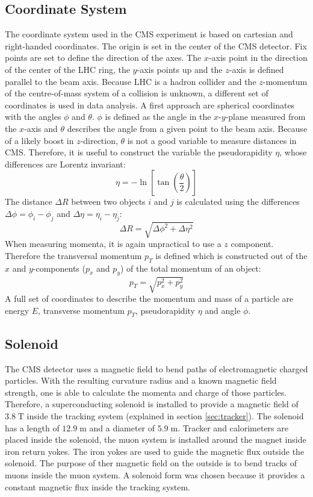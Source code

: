 \subsection{Coordinate System}
\label{sec:coordinate}
	The coordinate system used in the CMS experiment is based on cartesian and right-handed coordinates. The origin is set in the center of the CMS detector. Fix points are set to define the direction of the axes. The $x$-axis point in the direction of the center of the LHC ring, the $y$-axis points up and the $z$-axis is defined parallel to the beam axis. Because LHC is a hadron collider and the $z$-momentum of the centre-of-mass system of a collision is unknown, a different set of coordinates is used in data analysis. A first approach are spherical coordinates with the angles $\phi$ and $\theta$. $\phi$ is defined as the angle in the $x$-$y$-plane measured from the $x$-axis and $\theta$ describes the angle from a given point to the beam axis. Because of a likely boost in $z$-direction, $\theta$ is not a good variable to measure distances in CMS. Therefore, it is useful to construct the variable the pseudorapidity $\eta$, whose differences are Lorentz invariant:
	\begin{equation}
	\eta = - \ln \left[\tan\left( \frac{\theta}{2}\right) \right]
	\end{equation} 
	The distance $\Delta R$ between two objects $i$ and $j$ is calculated using the differences $\Delta \phi = \phi_i - \phi_j$ and $\Delta \eta = \eta_i - \eta_j$:
	\begin{equation}
	\Delta R = \sqrt{\Delta \phi ^2 + \Delta \eta ^2}
	\end{equation}
	When measuring momenta, it is again unpractical to use a $z$ component. Therefore the transversal momentum $p_T$ is defined which is constructed out of the $x$ and $y$-components ($p_x$ and $p_y$) of the total momentum of an object:
	\begin{equation}
	p_T = \sqrt{p_x^2 + p_y^2}
	\end{equation} 
	A full set of coordinates to describe the momentum and mass of a particle are energy $E$, transverse momentum $p_T$, pseudorapidity $\eta$ and angle $\phi$.
	
\subsection{Solenoid}
	The CMS detector uses a magnetic field to bend paths of electromagnetic charged particles. With the resulting curvature radius and a known magnetic field strength, one is able to calculate the momenta and charge of those particles. Therefore, a superconducting solenoid is installed to provide a magnetic field of $3.8\;\text{T}$ inside the tracking system (explained in section \ref{sec:tracker}). The solenoid has a length of $12.9\;\text{m}$ and a diameter of $5.9\;\text{m}$. Tracker and calorimeters are placed inside the solenoid, the muon system is installed around the magnet inside iron return yokes. The iron yokes are used to guide the magnetic flux outside the solenoid. The purpose of ther magnetic field on the outside is to bend tracks of muons inside the muon system. A solenoid form was chosen because it provides a constant magnetic flux inside the tracking system.
	
